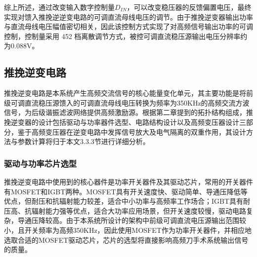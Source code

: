 综上所述，通过改变输入数字控制量$D_{IN}$，可以改变稳压器的反馈偏置电压，最终实现对馈入推挽逆逆变电路的可调直流母线电压的调节。由于推挽逆变器输出功率与直流母线电压幅值密切相关，因此该控制方式实现了对高频信号输出功率的可调控制，控制量采用 452 档离散调节方式，被控可调直流稳压源输出电压分辨率约为0.088V。

\subsection{推挽逆变电路}
推挽逆变电路是本系统产生高频交流信号的核心能量变化单元，其主要功能是将前级可调直流稳压源馈入的可调直流母线电压转换为频率为350KHz的高频交流方波信号，为后级谐振滤波网络提供高频激励源。根据第二章提到的拓扑结构组成，推挽逆变器的设计包括驱动与功率器件选型、电路结构设计以及高频变压器设计三部分，鉴于高频变压器在逆变电路中发挥信号放大及电气隔离的双重作用，其设计方法与参数计算将归于本文3.3.3节进行详细分析。
\subsubsection{驱动与功率芯片选型}
推挽逆变电路中使用到的核心器件是功率开关器件及其驱动芯片，常用的开关器件有MOSFET和IGBT两种。MOSFET具有开关速度快、驱动简单、导通压降低等优点，但耐压和抗辐射能力较差，适合中小功率与高频率工作场合；IGBT具有耐压高、抗辐射能力强等优点，适合大功率应用场景，但开关速度较慢，驱动电路复杂，导通压降较高。由于本系统所设计的架构中前级可调直流电压源输出范围较小，且开关频率为高频350KHz，因此使用MOSFET作为功率开关器件，并相应地选取合适的MOSFET驱动芯片，芯片的选型将直接影响高频刀手术系统输出信号的质量。


